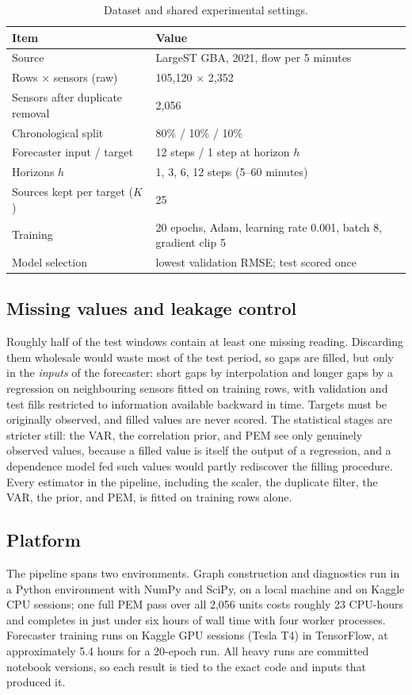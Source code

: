 \documentclass[MTech]{ugthesis}
\begin{document}
\begin{table}[htpb]
\small
\renewcommand{\arraystretch}{1.4}
\centering
\caption{Dataset and shared experimental settings.}
\label{tab:data}
\begin{tabular}{|p{6.5cm}|p{6.5cm}|}
\hline
Item & Value \\ \hline
Source & LargeST GBA, 2021, flow per 5 minutes \\ \hline
Rows $\times$ sensors (raw) & 105{,}120 $\times$ 2{,}352 \\ \hline
Sensors after duplicate removal & 2{,}056 \\ \hline
Chronological split & 80\% / 10\% / 10\% \\ \hline
Forecaster input / target & 12 steps / 1 step at horizon $h$ \\ \hline
Horizons $h$ & 1, 3, 6, 12 steps (5--60 minutes) \\ \hline
Sources kept per target ($K$) & 25 \\ \hline
Training & 20 epochs, Adam, learning rate 0.001, batch 8, gradient clip 5 \\ \hline
Model selection & lowest validation RMSE; test scored once \\ \hline
\end{tabular}
\end{table}

\subsection{Missing values and leakage control}
Roughly half of the test windows contain at least one missing reading. Discarding them wholesale would waste most of the test period, so gaps are filled, but only in the \emph{inputs} of the forecaster: short gaps by interpolation and longer gaps by a regression on neighbouring sensors fitted on training rows, with validation and test fills restricted to information available backward in time. Targets must be originally observed, and filled values are never scored. The statistical stages are stricter still: the VAR, the correlation prior, and PEM see only genuinely observed values, because a filled value is itself the output of a regression, and a dependence model fed such values would partly rediscover the filling procedure. Every estimator in the pipeline, including the scaler, the duplicate filter, the VAR, the prior, and PEM, is fitted on training rows alone.

\subsection{Platform}
The pipeline spans two environments. Graph construction and diagnostics run in a Python environment with NumPy and SciPy, on a local machine and on Kaggle CPU sessions; one full PEM pass over all 2,056 units costs roughly 23 CPU-hours and completes in just under six hours of wall time with four worker processes. Forecaster training runs on Kaggle GPU sessions (Tesla T4) in TensorFlow, at approximately 5.4 hours for a 20-epoch run. All heavy runs are committed notebook versions, so each result is tied to the exact code and inputs that produced it.
\end{document}
